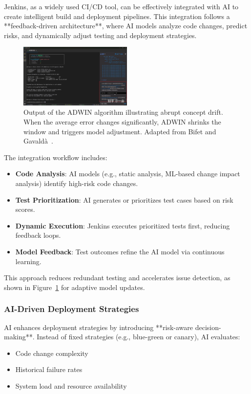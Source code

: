 \documentclass[manuscript,screen,review]{acmart}
\begin{document}
Jenkins, as a widely used CI/CD tool, can be effectively integrated with AI to create intelligent build and deployment pipelines. This integration follows a **feedback-driven architecture**, where AI models analyze code changes, predict risks, and dynamically adjust testing and deployment strategies.

\begin{figure}[H]
  \centering
  \includegraphics[width=0.5\textwidth]{picture/jenkins+ai+cursor.png}
  \caption{Output of the ADWIN algorithm illustrating abrupt concept drift. When the average error changes significantly, ADWIN shrinks the window and triggers model adjustment. Adapted from Bifet and Gavaldà~\cite{Bifet2007}.}
  \label{fig:adwin}
\end{figure}

The integration workflow includes:
\begin{itemize}
    \item \textbf{Code Analysis}: AI models (e.g., static analysis, ML-based change impact analysis) identify high-risk code changes.
    \item \textbf{Test Prioritization}: AI generates or prioritizes test cases based on risk scores.
    \item \textbf{Dynamic Execution}: Jenkins executes prioritized tests first, reducing feedback loops.
    \item \textbf{Model Feedback}: Test outcomes refine the AI model via continuous learning.
\end{itemize}

This approach reduces redundant testing and accelerates issue detection, as shown in Figure~\ref{fig:adwin} for adaptive model updates.

\subsubsection{AI-Driven Deployment Strategies}

AI enhances deployment strategies by introducing **risk-aware decision-making**. Instead of fixed strategies (e.g., blue-green or canary), AI evaluates:
\begin{itemize}
    \item Code change complexity
    \item Historical failure rates
    \item System load and resource availability
\end{itemize}
\end{document}
